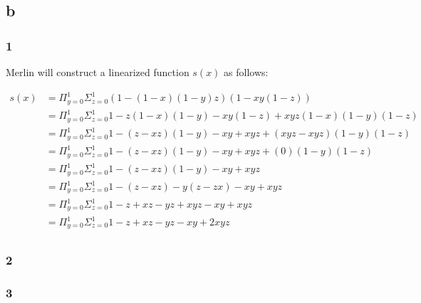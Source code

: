 \documentclass[letterpaper,notitlepage,twoside]{article}
\begin{document}
\subsection*{b}
\subsubsection*{1}
Merlin will construct a linearized function $s(x)$ as follows:

\begin{align*}
s(x) &= \Pi_{y = 0}^1\Sigma_{z = 0}^1 (1 - (1 - x)(1 - y)z)(1 - xy(1 - z)) \\
     &= \Pi_{y = 0}^1\Sigma_{z = 0}^1 1 - z(1 - x)(1 - y) - xy(1 - z) + xyz(1 - x)(1 - y)(1 - z) \\
     &= \Pi_{y = 0}^1\Sigma_{z = 0}^1 1 - (z - xz)(1 - y) - xy + xyz + (xyz - xyz)(1 - y)(1 - z) \\
     &= \Pi_{y = 0}^1\Sigma_{z = 0}^1 1 - (z - xz)(1 - y) - xy + xyz + (0)(1 - y)(1 - z) \\
     &= \Pi_{y = 0}^1\Sigma_{z = 0}^1 1 - (z - xz)(1 - y) - xy + xyz \\
     &= \Pi_{y = 0}^1\Sigma_{z = 0}^1 1 - (z - xz) - y(z - zx) - xy + xyz \\
     &= \Pi_{y = 0}^1\Sigma_{z = 0}^1 1 - z + xz - yz + xyz - xy + xyz \\
     &= \Pi_{y = 0}^1\Sigma_{z = 0}^1 1 - z + xz - yz - xy + 2xyz \\
\end{align*}

\subsubsection*{2}
\subsubsection*{3}
\end{document}

